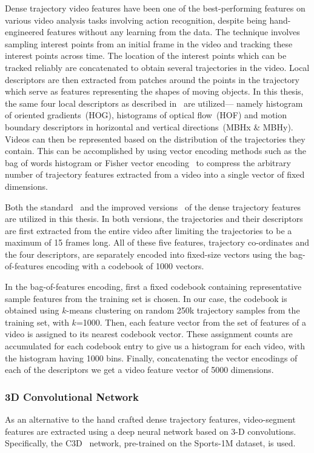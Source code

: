Dense trajectory video features have been one of the best-performing features
on various video analysis tasks involving action recognition, despite being
hand-engineered features without any learning from the data.
The technique involves sampling interest points from an initial frame in the
video and tracking these interest points across time.
The location of the interest points which can be tracked reliably are concatenated
to obtain several trajectories in the video.
Local descriptors are then extracted from patches around the points in the
trajectory which serve as features representing the shapes of moving objects.
In this thesis, the same four local descriptors as described
in~\cite{DBLP:conf/cvpr/WangKSL11, Wang2013} are utilized--- namely histogram of
oriented gradients~(HOG), histograms of optical flow~(HOF) and motion boundary
descriptors in horizontal and vertical directions~(MBHx \& MBHy).
Videos can then be represented based on the distribution of the trajectories
they contain.
This can be accomplished by using vector encoding methods such as the bag of
words histogram or Fisher vector encoding~\cite{perronnin2010improving} to
compress the arbitrary number of trajectory features extracted from a video into
a single vector of fixed dimensions.

Both the standard~\cite{DBLP:conf/cvpr/WangKSL11} and the improved
versions~\cite{Wang2013} of the dense trajectory features are utilized in this
thesis.
In both versions, the trajectories and their descriptors are first extracted
from the entire video after limiting the trajectories to be a maximum of 15
frames long.
All of these five features, trajectory co-ordinates and the four descriptors,
are separately encoded into fixed-size vectors using the bag-of-features encoding
with a codebook of 1000 vectors.

In the bag-of-features encoding, first a fixed codebook containing representative
sample features from the training set is chosen.
In our case, the codebook is obtained using $k$-means clustering on random 250k
trajectory samples from the training set, with $k$=1000.
Then, each feature vector from the set of features of a video is assigned to its
nearest codebook vector.
These assignment counts are accumulated for each codebook entry to give us a
histogram for each video, with the histogram having 1000 bins.
Finally, concatenating the vector encodings of each of the descriptors we get a
video feature vector of 5000 dimensions. 

\subsubsection{3D Convolutional Network}
As an alternative to the hand crafted dense trajectory features, video-segment
features are extracted using a deep neural network based on 3-D convolutions. 
Specifically, the C3D~\cite{DBLP:C3D} network, pre-trained on the Sports-1M
dataset, is used.

